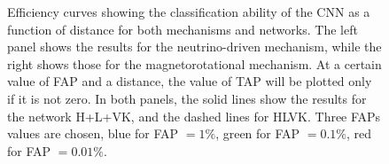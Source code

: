 \documentclass[aps,twocolumn,showpacs,groupedaddress, nofootinbib]{revtex4}  %
\begin{document}
%
%
\begin{figure}
     \begin{center}
        \quad
    \end{center}
    \caption{Efficiency curves showing the classification ability of the
\ac{CNN} as a function of distance for both mechanisms and networks.  The left
panel shows the results for the neutrino-driven mechanism, while the right
shows those for the magnetorotational mechanism. 
At a certain value of \ac{FAP} and a distance, the value of \ac{TAP}
will be plotted only if it is not zero.
In both panels, the solid
lines show the results for the network H+L+VK, and the dashed lines for HLVK.
Three \acp{FAP} values are chosen, blue for \ac{FAP} $=1\%$, green for \ac{FAP}
$=0.1\%$, red for \ac{FAP} $=0.01\%$.\label{fig:eff}}
\end{figure}
\end{document}
